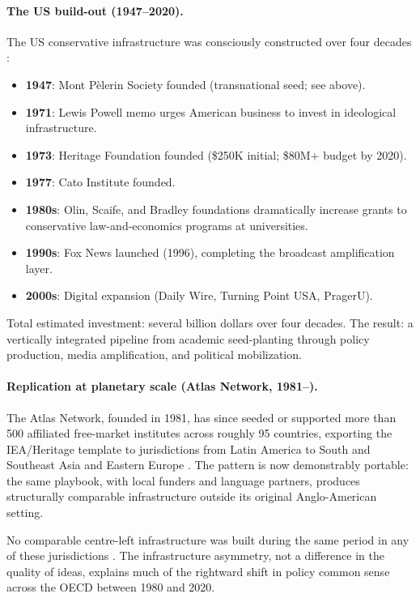 \begin{example}
\paragraph{The US build-out (1947--2020).}
The US conservative infrastructure was consciously constructed over four decades \autocite{mayer2016, phillipsfein2009}:
\begin{itemize}[nosep]
  \item \textbf{1947}: Mont P\`{e}lerin Society founded (transnational seed; see above).
  \item \textbf{1971}: Lewis Powell memo urges American business to invest in ideological infrastructure.
  \item \textbf{1973}: Heritage Foundation founded (\$250K initial; \$80M+ budget by 2020).
  \item \textbf{1977}: Cato Institute founded.
  \item \textbf{1980s}: Olin, Scaife, and Bradley foundations dramatically increase grants to conservative law-and-economics programs at universities.
  \item \textbf{1990s}: Fox News launched (1996), completing the broadcast amplification layer.
  \item \textbf{2000s}: Digital expansion (Daily Wire, Turning Point USA, PragerU).
\end{itemize}
Total estimated investment: several billion dollars over four decades.
The result: a vertically integrated pipeline from academic seed-planting through policy production, media amplification, and political mobilization.

\paragraph{Replication at planetary scale (Atlas Network, 1981--).}
The Atlas Network, founded in 1981, has since seeded or supported more than 500 affiliated free-market institutes across roughly 95 countries, exporting the IEA/Heritage template to jurisdictions from Latin America to South and Southeast Asia and Eastern Europe \autocite{djelic2014, plehwe2006}.
The pattern is now demonstrably portable: the same playbook, with local funders and language partners, produces structurally comparable infrastructure outside its original Anglo-American setting.

No comparable centre-left infrastructure was built during the same period in any of these jurisdictions \autocite{mudge2018}.
The infrastructure asymmetry, not a difference in the quality of ideas, explains much of the rightward shift in policy common sense across the OECD between 1980 and 2020.
\end{example}

